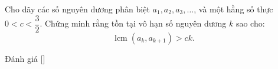 \ifshowproblem
\begin{problem}\label{problem:CHN-2015-TST1-P2}
	Cho dãy các số nguyên dương phân biệt \( a_1, a_2, a_3, \ldots \), và một hằng số thực \( 0 < c < \dfrac{3}{2} \).  
	Chứng minh rằng tồn tại vô hạn số nguyên dương \( k \) sao cho:
	\[
		\operatorname{lcm}(a_k, a_{k+1}) > c k.
	\]
\end{problem}
\fi

\ifshowinfo
Đánh giá [\textbf{}]\footnotemark
{}
\fi